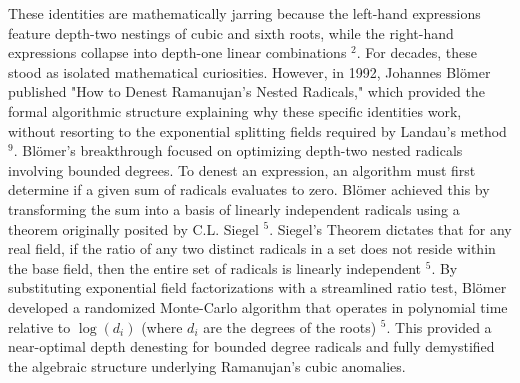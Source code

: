 \documentclass[10pt]{article}
\begin{document}
These identities are mathematically jarring because the left-hand expressions feature depth-two nestings of cubic and sixth roots, while the right-hand expressions collapse into depth-one linear combinations ${ }^{2}$. For decades, these stood as isolated mathematical curiosities. However, in 1992, Johannes Blömer published "How to Denest Ramanujan's Nested Radicals," which provided the formal algorithmic structure explaining why these specific identities work, without resorting to the exponential splitting fields required by Landau's method ${ }^{9}$. Blömer's breakthrough focused on optimizing depth-two nested radicals involving bounded degrees. To denest an expression, an algorithm must first determine if a given sum of radicals evaluates to zero. Blömer achieved this by transforming the sum into a basis of linearly independent radicals using a theorem originally posited by C.L. Siegel ${ }^{5}$. Siegel's Theorem dictates that for any real field, if the ratio of any two distinct radicals in a set does not reside within the base field, then the entire set of radicals is linearly independent ${ }^{5}$. By substituting exponential field factorizations with a streamlined ratio test, Blömer developed a randomized Monte-Carlo algorithm that operates in polynomial time relative to $\log \left(d_{i}\right)$ (where $d_{i}$ are the degrees of the roots) ${ }^{5}$. This provided a near-optimal depth denesting for bounded degree radicals and fully demystified the algebraic structure underlying Ramanujan's cubic anomalies.
\end{document}
